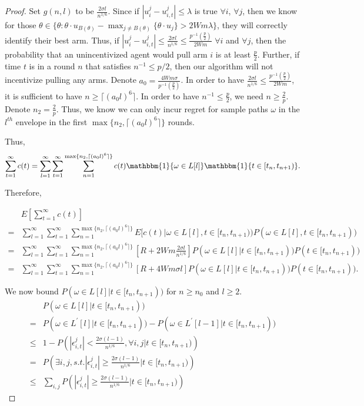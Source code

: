 \documentclass{article}
\begin{document}
\begin{proof}
Set $g(n,l)$ to be $\frac{2\sigma l}{n^{1/6}}$. Since if $|u_{i}^{j}-u_{i,t}^{j}|\leq \lambda$ is true $\forall i$, $\forall j$, then we know for those $\theta\in \{\theta:\theta\cdot u_{B(\theta)}-\max_{j\neq B(\theta)}\{\theta \cdot u_{j}\}> 2Wm\lambda\}$, they will correctly identify their best arm. Thus, if $|u_{i}^{j}-u_{i,t}^{j}|\leq \frac{2\sigma l}{n^{1/6}} \leq \frac{p^{-1}(\frac{p}{2})}{2Wm}$ $\forall i$ and $\forall j$, then the probability that an unincentivized agent would pull arm $i$ is at least $\frac{p}{2}$. Further, if time $t$ is in a round $n$ that satisfies $n^{-1}\leq p/2$, then our algorithm will not incentivize pulling any arms. Denote $a_0=\frac{4Wm\sigma}{p^{-1}(\frac{p}{2})}$. In order to have $\frac{2\sigma l}{n^{1/6}}\leq \frac{p^{-1}(\frac{p}{2})}{2Wm}$, it is sufficient to have $n\geq \lceil (a_{0} l)^6 \rceil$. In order to have $n^{-1}\leq \frac{p}{2}$, we need $n\geq \frac{2}{p}$. Denote $n_2=\frac{2}{p}$. Thus, we know we can only incur regret for sample paths $\omega$ in the $l^{th}$ envelope in the first $\max\{n_2,\lceil (a_0 l)^6 \rceil\}$ rounds.

Thus,
\begin{align}
\sum_{t=1}^{\infty}c(t)=\sum_{l=1}^{\infty}\sum_{t=1}^{\infty}\sum_{n=1}^{\max\{n_2,\lceil (a_0 l)^6 \rceil\}}c(t)\mathbbm{1}\{\omega\in L[l]\}\mathbbm{1}\{t\in [t_n,t_{n+1})\}. \nonumber
\end{align}

Therefore,

\begin{align}
&E\left[\sum_{t=1}^{\infty}c(t)\right] \nonumber\\
=&\sum_{l=1}^{\infty}\sum_{t=1}^{\infty}\sum_{n=1}^{\max\{n_2,\lceil (a_0 l)^6 \rceil\}}E[c(t)|\omega \in L[l],t\in [t_n,t_{n+1}))P(\omega\in L[l],t\in [t_n,t_{n+1})) \nonumber \\
=&\sum_{l=1}^{\infty}\sum_{t=1}^{\infty}\sum_{n=1}^{\max\{n_2,\lceil (a_0 l)^6 \rceil\}}\left[R+2Wm\frac{2\sigma l}{n^{1/6}}\right]P(\omega\in L[l]|t\in [t_n,t_{n+1}))P(t\in [t_n,t_{n+1})) \nonumber \\
=&\sum_{l=1}^{\infty}\sum_{t=1}^{\infty}\sum_{n=1}^{\max\{n_2,\lceil (a_0 l)^6 \rceil\}}\left[R+4Wm\sigma l\right]P(\omega\in L[l]|t\in [t_n,t_{n+1}))P(t\in [t_n,t_{n+1})). \nonumber
\end{align}

We now bound $P(\omega\in L[l]|t\in[t_{n},t_{n+1}))$ for $n\geq n_0$ and $l\geq 2$.
\begin{align}
&P(\omega\in L[l]|t\in[t_{n},t_{n+1})) \nonumber \\
=&P(\omega\in L^{'}[l]|t\in[t_{n},t_{n+1}))- P(\omega\in L^{'}[l-1]|t\in[t_{n},t_{n+1})) \nonumber \\
\leq & 1-P\left(|\epsilon_{i,t}^{j}|<\frac{2\sigma (l-1)}{n^{1/6}}, \forall i,j|t\in[t_n,t_{n+1})\right) \nonumber \\
=&P\left(\exists i,j, s.t. |\epsilon_{i,t}^{j}|\geq \frac{2\sigma (l-1)}{n^{1/6}}|t\in[t_n,t_{n+1})\right) \nonumber  \\
\leq &\sum_{i,j}P\left(|\epsilon_{i,t}^{j}|\geq \frac{2\sigma (l-1)}{n^{1/6}}|t\in[t_n,t_{n+1})\right) \nonumber
\end{align}


\end{proof}
\end{document}
